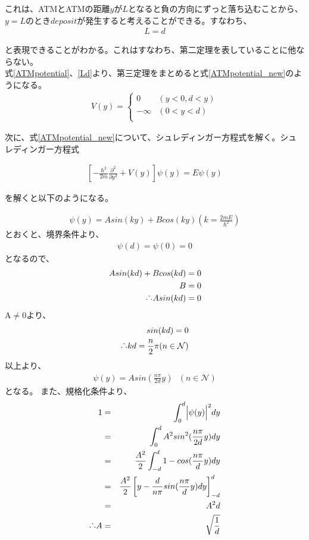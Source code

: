 \documentclass[12pt]{jsarticle}
\begin{document}
これは、ATMとATMの距離$y$が$L$となると負の方向にずっと落ち込むことから、$y=L$のとき$deposit$が発生すると考えることができる。すなわち、
\begin{eqnarray}
L = d
\label{Ld}
\end{eqnarray}

と表現できることがわかる。これはすなわち、第二定理を表していることに他ならない。\\
式\ref{ATMpotential}、\ref{Ld}より、第三定理をまとめると式\ref{ATMpotential_new}のようになる。
\begin{eqnarray}
V(y)=\left\{ \begin{array}{ll}
0 & (y<0,  d<y) \\
-\infty & (0<y<d) \\
\end{array} \right.
\label{ATMpotential_new}
\end{eqnarray}

次に、式\ref{ATMpotential_new}について、シュレディンガー方程式を解く。シュレディンガー方程式

\begin{eqnarray}
\left[ -\frac{\hbar^{2}}{2m} \frac{\partial^{2}}{\partial y^{2}} + V(y) \right] \psi(y)= E \psi (y) 
\label{schoredinger}
\end{eqnarray}

を解くと以下のようになる。

\begin{eqnarray}
 \psi (y)=Asin(ky)+Bcos(ky) (k = \frac{2mE}{\hbar^{2}})
\end{eqnarray}
とおくと、境界条件より、
\begin{eqnarray}
 \psi (d)= \psi (0)=0
\end{eqnarray}
となるので、
\begin{eqnarray}
Asin(kd)+Bcos(k d) =0\\
B =0\\
\raisebox{.2ex}{.}\raisebox{1.2ex}{.}\raisebox{.2ex}{.}Asin(kd)=0
\end{eqnarray}
A$\neq$0より、
\begin{eqnarray}
sin(k d)=0\\
\raisebox{.2ex}{.}\raisebox{1.2ex}{.}\raisebox{.2ex}{.} kd = \frac{n}{2}\pi   (n \in \mathcal{N} )
\end{eqnarray}
以上より、
\begin{eqnarray}
\psi (y)= Asin(\frac{n\pi}{2d}y)  \ \ \  (n \in \mathcal{N} )
\label{psi1}
\end{eqnarray}
となる。
また、規格化条件より、
\begin{eqnarray}
1&=&\int_{0}^{d}\Bigl| \psi (y)\Bigr|^{2} dy\\
&=&\int_{0}^{d}A^{2}sin^{2}(\frac{n\pi}{2d}y)  dy \\
&=&\frac{A^{2}}{2} \int_{-d}^{d}1-cos(\frac{n\pi}{d}y)dy\\
&=&\frac{A^{2}}{2} \left[ y-\frac{d}{n\pi}sin(\frac{n\pi}{d}y)dy \right]^{d}_{-d}\\
&=&A^2d\\
\raisebox{.2ex}{.}\raisebox{1.2ex}{.}\raisebox{.2ex}{.} A&=&\sqrt{\frac{1}{d}}
\end{eqnarray}
\end{document}
